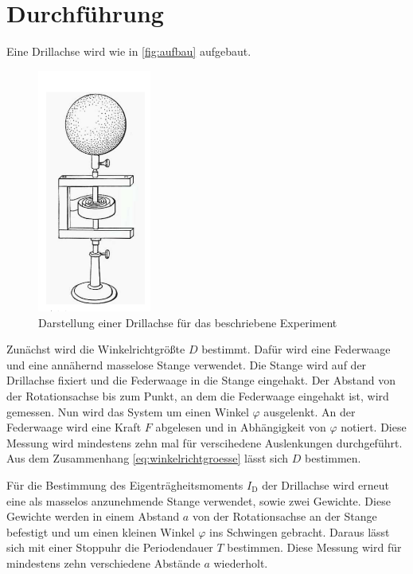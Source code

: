 \section{Durchführung}
\label{sec:Durchführung}

Eine Drillachse wird wie in \autoref{fig:aufbau} aufgebaut.

\begin{figure}
    \centering
    \includegraphics[height=8cm]{images/aufbau.png}
    \caption{Darstellung einer Drillachse für das beschriebene Experiment \cite{V101}}
    \label{fig:aufbau}
\end{figure}

Zunächst wird die Winkelrichtgrößte $D$ bestimmt. 
Dafür wird eine Federwaage und eine annähernd masselose Stange verwendet.
Die Stange wird auf der Drillachse fixiert und die Federwaage in die Stange eingehakt. 
Der Abstand von der Rotationsachse bis zum Punkt, an dem die Federwaage eingehakt ist, wird gemessen.
Nun wird das System um einen Winkel $\varphi$ ausgelenkt. 
An der Federwaage wird eine Kraft $F$ abgelesen und in Abhängigkeit von $\varphi$ notiert. 
Diese Messung wird mindestens zehn mal für verscihedene Auslenkungen durchgeführt. 
Aus dem Zusammenhang \autoref{eq:winkelrichtgroesse} lässt sich $D$ bestimmen.

Für die Bestimmung des Eigenträgheitsmoments $I_\text{D}$ der Drillachse wird erneut eine als masselos anzunehmende Stange verwendet, sowie zwei Gewichte.
Diese Gewichte werden in einem Abstand $a$ von der Rotationsachse an der Stange befestigt und um einen kleinen Winkel $\varphi$ ins Schwingen gebracht. 
Daraus lässt sich mit einer Stoppuhr die Periodendauer $T$ bestimmen. 
Diese Messung wird für mindestens zehn verschiedene Abstände $a$ wiederholt. 

